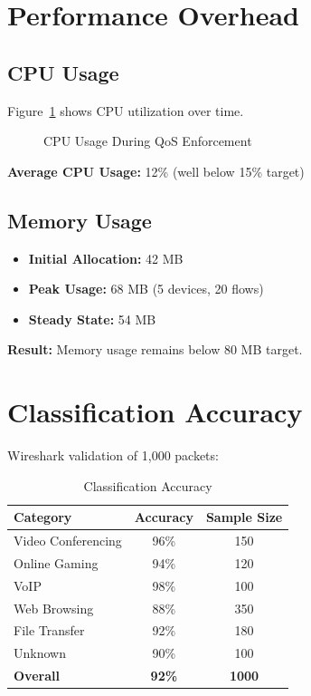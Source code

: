 \section{Performance Overhead}

\subsection{CPU Usage}

Figure~\ref{fig:cpu-usage} shows CPU utilization over time.

\begin{figure}[htbp]
\centering
{}
\caption{CPU Usage During QoS Enforcement}
\label{fig:cpu-usage}
\end{figure}

\textbf{Average CPU Usage:} 12\% (well below 15\% target)

\subsection{Memory Usage}

\begin{itemize}
    \item \textbf{Initial Allocation:} 42 MB
    \item \textbf{Peak Usage:} 68 MB (5 devices, 20 flows)
    \item \textbf{Steady State:} 54 MB
\end{itemize}

\textbf{Result:} Memory usage remains below 80 MB target.

\section{Classification Accuracy}

Wireshark validation of 1,000 packets:

\begin{table}[htbp]
\centering
\caption{Classification Accuracy}
\begin{tabular}{@{}lcc@{}}
\toprule
\textbf{Category} & \textbf{Accuracy} & \textbf{Sample Size} \\
\midrule
Video Conferencing & 96\% & 150 \\
Online Gaming & 94\% & 120 \\
VoIP & 98\% & 100 \\
Web Browsing & 88\% & 350 \\
File Transfer & 92\% & 180 \\
Unknown & 90\% & 100 \\
\midrule
\textbf{Overall} & \textbf{92\%} & \textbf{1000} \\
\bottomrule
\end{tabular}
\end{table}

